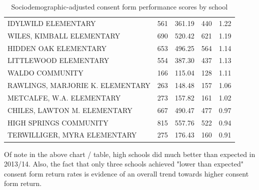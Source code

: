 \documentclass{article}
\begin{document}
\begin{table}[H]
\begin{table}[ht]
{\begin{tabular}{lrrrr}
  IDYLWILD ELEMENTARY & 561 & 361.19 & 440 & 1.22 \\ 
  WILES, KIMBALL ELEMENTARY & 690 & 520.42 & 621 & 1.19 \\ 
  HIDDEN OAK ELEMENTARY & 653 & 496.25 & 564 & 1.14 \\ 
  LITTLEWOOD ELEMENTARY & 554 & 387.30 & 437 & 1.13 \\ 
  WALDO COMMUNITY  & 166 & 115.04 & 128 & 1.11 \\ 
  RAWLINGS, MARJORIE K. ELEMENTARY & 263 & 148.48 & 157 & 1.06 \\ 
  METCALFE, W.A. ELEMENTARY & 273 & 157.82 & 161 & 1.02 \\ 
  CHILES, LAWTON M. ELEMENTARY & 667 & 490.47 & 477 & 0.97 \\ 
  HIGH SPRINGS COMMUNITY  & 815 & 557.76 & 522 & 0.94 \\ 
  TERWILLIGER, MYRA ELEMENTARY & 275 & 176.43 & 160 & 0.91 \\ 
   \hline
\end{tabular}
}
\caption{Sociodemographic-adjusted consent form performance scores by school} 
\end{table}\end{table}

Of note in the above chart / table, high schools did much better than expected in 2013/14.  Also, the fact that only three schools achieved "lower than expected" consent form return rates is evidence of an overall trend towards higher consent form return.

\begin{center}
\end{center}
\end{document}

